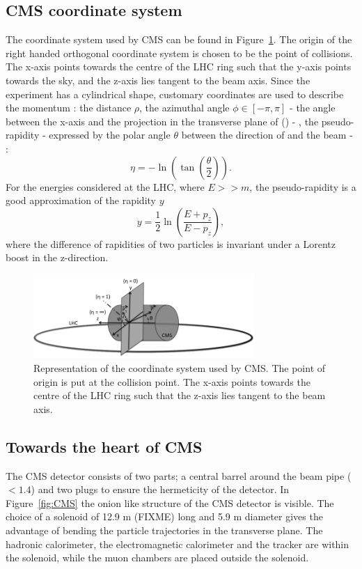 \subsection{CMS coordinate system}
The coordinate system used by CMS can be found in Figure~\ref{fig:CMScoord}. The origin of the right handed orthogonal coordinate system is chosen to be the point of collisions. The x-axis points towards the centre of the LHC ring such that the y-axis points towards the sky, and the z-axis lies tangent to the beam axis. Since the experiment has a cylindrical shape, customary coordinates are used to describe the momentum \impuls: the distance $\rho$, the azimuthal angle $\phi \in \left[-\pi,\pi\right]$ - the angle between the x-axis and the projection in the transverse plane of \impuls (\trimpuls) - , the pseudo-rapidity \psrap - expressed by the polar angle $\theta$ between the direction of \impuls and the beam - : 
\begin{equation}
\eta = - \ln \left(\tan \left(\frac{\theta}{2}\right)\right).
\end{equation}
For the energies considered at the LHC, where $E >> m$, the pseudo-rapidity is a good approximation of the rapidity $y$
\begin{equation}
y = \frac{1}{2} \ln \left(\frac{E + p_z}{E - p_z}\right), 
\end{equation}
where the difference of rapidities of two particles is invariant under a Lorentz boost in the z-direction.
 \begin{figure}[ht]
	\centering
	\includegraphics[width=0.75\textwidth]{2_ExperimentalSetup/Figures/imageedit_1_9146672677}
	\caption{Representation of the coordinate system used by CMS. The point of origin is put at the collision point. The x-axis points towards the centre of the LHC ring such that the z-axis lies tangent to the beam axis. }
	\label{fig:CMScoord}
\end{figure}

\subsection{Towards the heart of CMS}
The CMS detector consists of two parts; a central barrel around the beam pipe (\abspsrap $<1.4$) and two plugs to ensure the hermeticity of the detector. In Figure~\ref{fig:CMS} the onion like structure of the CMS detector is visible. The choice of a solenoid of 12.9 \si{ \meter} (FIXME) long and 5.9 \si{ \meter}
diameter gives the advantage of bending the particle trajectories in the transverse plane. The hadronic calorimeter,  the electromagnetic calorimeter and the tracker are within the solenoid, while the muon chambers are placed outside the solenoid.

